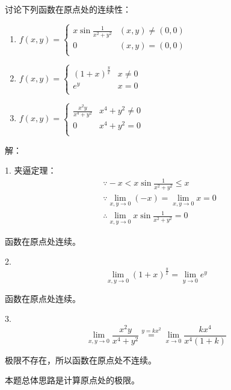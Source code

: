 \begin{exercise}
讨论下列函数在原点处的连续性：
\begin{enumerate}
    \item 
    $
    f\left( x,y \right) =\begin{cases}
        x\sin \frac{1}{x^2+y^2} & \left( x,y \right) \ne \left( 0,0 \right)\\
        0                       & \left( x,y \right) =\left( 0,0 \right)\\
    \end{cases}
    $
    \item 
    $
    f\left( x,y \right) =\begin{cases}
        \left( 1+x \right) ^{\frac{y}{x}} & x\ne 0\\
        e^y                               & x=0\\
    \end{cases}
    $
    \item 
    $
    f\left( x,y \right) =\begin{cases}
        \frac{x^2y}{x^4+y^2} & x^4+y^2\ne 0\\
        0                    & x^4+y^2=0\\
    \end{cases}
    $
\end{enumerate}
\end{exercise}

解：

1. 夹逼定理：
\begin{align*}
&\because -x<x\sin \frac{1}{x^2+y^2}\leqslant x \\
&\because \underset{x,y\rightarrow 0}{\lim}\left( -x \right) =\underset{x,y\rightarrow 0}{\lim}x=0 \\
&\therefore \underset{x,y\rightarrow 0}{\lim}x\sin \frac{1}{x^2+y^2}=0
\end{align*}

函数在原点处连续。

2.
\[
\underset{x,y\rightarrow 0}{\lim}\left( 1+x \right) ^{\frac{y}{x}}=\underset{y\rightarrow 0}{\lim}e^y
\]

函数在原点处连续。

3.
\[
\underset{x,y\rightarrow 0}{\lim}\frac{x^2y}{x^4+y^2}\overset{y=kx^2}{=}\underset{x\rightarrow 0}{\lim}\frac{kx^4}{x^4\left( 1+k \right)}
\]

极限不存在，所以函数在原点处不连续。

\begin{tcolorbox}
本题总体思路是计算原点处的极限。
\end{tcolorbox}





